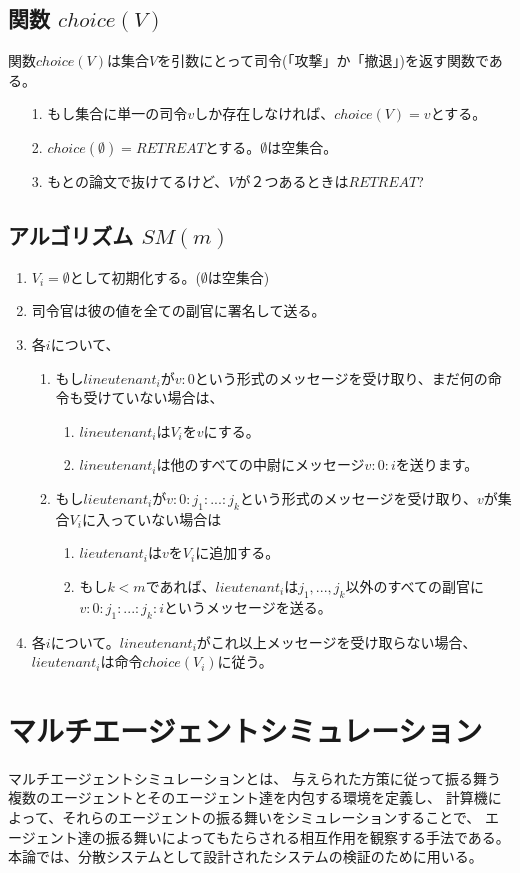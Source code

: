 \subsection{関数 $choice(V)$}
関数$choice(V)$は集合$V$を引数にとって司令(「攻撃」か「撤退」)を返す関数である。
\begin{enumerate}
  \item[1.] もし集合に単一の司令$v$しか存在しなければ、$choice(V) = v$とする。
  \item[2.] $choice(\emptyset) = RETREAT$とする。$\emptyset$は空集合。
  \item[3.] もとの論文で抜けてるけど、$V$が２つあるときは$RETREAT$?
\end{enumerate}

\subsection{アルゴリズム $SM(m)$}
\begin{enumerate}
  \item $V_i=\emptyset$として初期化する。($\emptyset$は空集合)
  \item 司令官は彼の値を全ての副官に署名して送る。
  \item 各$i$について、 
  \begin{enumerate}
    \item もし$lineutenant_i$が$v:0$という形式のメッセージを受け取り、まだ何の命令も受けていない場合は、
    \begin{enumerate}
      \item $lineutenant_i$は$ V_i$を${v}$にする。 
      \item $lineutenant_i$は他のすべての中尉にメッセージ$v:0:i$を送ります。
    \end{enumerate}
    \item もし$lieutenant_i$が$v:0:j_1:...:j_k$という形式のメッセージを受け取り、$v$が集合$V_i$に入っていない場合は
    \begin{enumerate}
      \item $lieutenant_i$は$v$を$V_i$に追加する。
      \item もし$k<m$であれば、$lieutenant_i$は$j_1, ..., j_k$以外のすべての副官に$v:0:j_1:...:j_k:i$というメッセージを送る。
    \end{enumerate}
  \end{enumerate}
  \item 各$i$について。$lineutenant_i$がこれ以上メッセージを受け取らない場合、$lieutenant_i$は命令$choice(V_i)$に従う。
\end{enumerate}

\section{マルチエージェントシミュレーション}
マルチエージェントシミュレーションとは、
与えられた方策に従って振る舞う複数のエージェントとそのエージェント達を内包する環境を定義し、
計算機によって、それらのエージェントの振る舞いをシミュレーションすることで、
エージェント達の振る舞いによってもたらされる相互作用を観察する手法である。
本論では、分散システムとして設計されたシステムの検証のために用いる。


